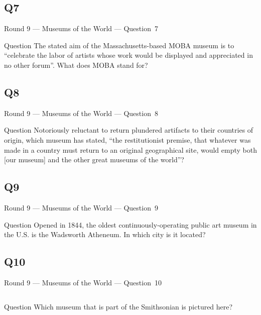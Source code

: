 \documentclass[11pt]{beamer}
\begin{document}
\subsection*{Q7}
\begin{frame}[t]{Round 9 --- Museums of the World --- \mbox{Question 7}}
\vspace{-0.5em}
\begin{block}{Question}
The stated aim of the Massachusetts-based MOBA museum is to ``celebrate the labor of artists whose work would be displayed and appreciated in no other forum''. What does MOBA stand for?
\end{block}
\end{frame}
\subsection*{Q8}
\begin{frame}[t]{Round 9 --- Museums of the World --- \mbox{Question 8}}
\vspace{-0.5em}
\begin{block}{Question}
Notoriously reluctant to return plundered artifacts to their countries of origin, which museum has stated, ``the restitutionist premise, that whatever was made in a country must return to an original geographical site, would empty both [our museum] and the other great museums of the world''?
\end{block}
\end{frame}
\subsection*{Q9}
\begin{frame}[t]{Round 9 --- Museums of the World --- \mbox{Question 9}}
\vspace{-0.5em}
\begin{block}{Question}
Opened in 1844, the oldest continuously-operating public art museum in the U.S. is the Wadsworth Atheneum. In which city is it located?
\end{block}
\end{frame}
\subsection*{Q10}
\begin{frame}[t]{Round 9 --- Museums of the World --- \mbox{Question 10}}
\vspace{-0.5em}
\begin{columns}[T,totalwidth=\linewidth]
\begin{column}{0.32\linewidth}
\begin{block}{Question}
Which museum that is part of the Smithsonian is pictured here?
\end{block}
\end{column}
\begin{column}{0.65\linewidth}
\begin{center}
\texttt{[image: \{Images/nmaahc]}.jpg}
\end{center}
\end{column}
\end{columns}
\end{frame}
\end{document}
